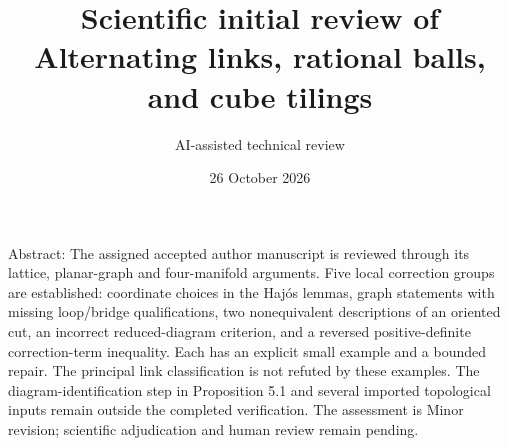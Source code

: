 \documentclass[10pt]{article}
\title{Scientific initial review of
Alternating links, rational balls, and cube tilings}
\author{AI-assisted technical review}
\date{26 October 2026}
\begin{document}
\maketitle
Abstract: The assigned accepted author manuscript is reviewed through its lattice, planar-graph and four-manifold arguments. Five local correction groups are established: coordinate choices in the Hajós lemmas, graph statements with missing loop/bridge qualifications, two nonequivalent descriptions of an oriented cut, an incorrect reduced-diagram criterion, and a reversed positive-definite correction-term inequality. Each has an explicit small example and a bounded repair. The principal link classification is not refuted by these examples. The diagram-identification step in Proposition 5.1 and several imported topological inputs remain outside the completed verification. The assessment is Minor revision; scientific adjudication and human review remain pending.\par
\end{document}
